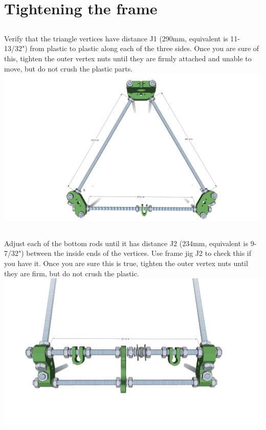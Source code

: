 \documentclass[twoside,a4paper,titlepage]{memoir}
\begin{document}
	\chapter{Tightening the frame}
	
	\section{}
	Verify that the triangle vertices have distance J1 (290mm, equivalent is 11-13/32") from plastic to plastic
	along each of the three sides. Once you are sure of this, tighten the outer vertex nuts until they are
	firmly attached and unable to move, but do not crush the plastic parts.\\
	\includegraphics[width=1\linewidth]{graphics/ch5_1.png}
	
	\section{}
	Adjust each of the bottom rods until it has distance J2 (234mm, equivalent is 9-7/32") between the
	inside ends of the vertices. Use frame jig J2 to check this if you have it. Once you are sure this is true,
	tighten the outer vertex nuts until they are firm, but do not crush the plastic.\\
	\includegraphics[width=1\linewidth]{graphics/ch5_2.png}
	
\end{document}
